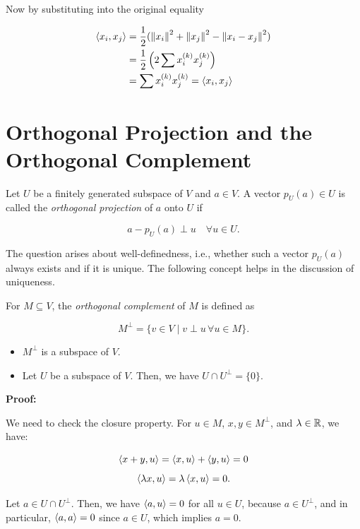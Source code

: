 Now by substituting into the original equality

\begin{align*} 
    \left\langle x_i, x_j\right\rangle &= \frac{1}{2} (\left\| x_i \right\|^2 + \left\| x_j \right\|^2 - \left\| x_i - x_j \right\|^2) \\ 
     &= \frac{1}{2} \left(2 \sum x_i^{(k)} x_j^{(k)}\right) \\ 
     &= \sum x_i^{(k)} x_j^{(k)} =  \left\langle x_i, x_j\right\rangle
\end{align*}

\QED

\section{Orthogonal Projection and the Orthogonal Complement}

Let \( U \) be a finitely generated subspace of \( V \) and \( a \in V \). A vector  \( p_U(a) \in U \) is called the 
\emph{orthogonal projection} of \(a\) onto \( U \) if

\[
    a - p_U(a) \perp u \quad \forall u \in U.
\]

The question arises about well-definedness, i.e., whether such a vector \( p_U(a) \) always exists and 
if it is unique. The following concept helps in the discussion of uniqueness.

For \( M \subseteq V \), the \emph{orthogonal complement} of \( M \) is defined as

\[
    M^\perp = \{ v \in V \mid v \perp u \, \forall u \in M \}.
\]

\begin{itemize}

    \item \( M^\perp \) is a subspace of \( V \).

    \item Let \( U \) be a subspace of \( V \). Then, we have \( U \cap U^\perp = \{0\} \).

\end{itemize}

\textbf{Proof:}

We need to check the closure property. For \( u \in M \), \( x, y \in M^\perp \), and 
\( \lambda \in \mathbb{R} \), we have:

\[
    \left\langle x + y, u\right\rangle = \left\langle x, u\right\rangle + \left\langle y, u\right\rangle = 0
\]
\[
    \left\langle\lambda x, u\right\rangle = \lambda \left\langle x, u\right\rangle = 0.
\]

Let \( a \in U \cap U^\perp \). Then, we have \( \left\langle a, u\right\rangle = 0 \) for all \( u \in U \), because \( a \in U^\perp \), and in particular, 
\( \left\langle a, a\right\rangle = 0 \) since \( a \in U \), which implies \( a = 0 \).

